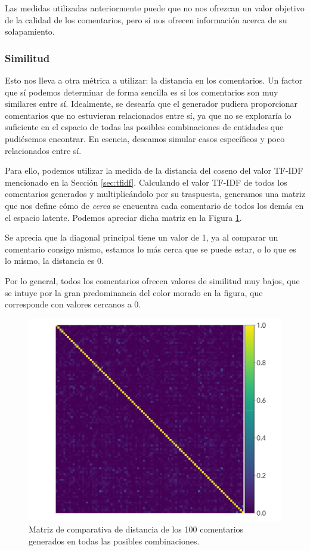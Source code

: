 Las medidas utilizadas anteriormente puede que no nos ofrezcan un valor objetivo de la calidad de los comentarios, pero sí nos ofrecen información acerca de su solapamiento.

\subsubsection{Similitud}
Esto nos lleva a otra métrica a utilizar: la distancia en los comentarios. Un factor que sí podemos determinar de forma sencilla es si los comentarios son muy similares entre sí. Idealmente, se desearía que el generador pudiera proporcionar comentarios que no estuvieran relacionados entre sí, ya que no se exploraría lo suficiente en el espacio de todas las posibles combinaciones de entidades que pudiésemos encontrar. En esencia, deseamos simular casos específicos y poco relacionados entre sí.

Para ello, podemos utilizar la medida de la distancia del coseno del valor TF-IDF mencionado en la  Sección \ref{sec:tfidf}. Calculando el valor TF-IDF de todos los comentarios generados y multiplicándolo por su traspuesta, generamos una matriz que nos define cómo de \textit{cerca} se encuentra cada comentario de todos los demás en el espacio latente. Podemos apreciar dicha matriz en la Figura \ref{fig:conf-tfidf}.

Se aprecia que la diagonal principal tiene un valor de 1, ya al comparar un comentario consigo mismo, estamos lo más cerca que se puede estar, o lo que es lo mismo, la distancia es 0.

Por lo general, todos los comentarios ofrecen valores de similitud muy bajos, que se intuye por la gran predominancia del color morado en la figura, que corresponde con valores cercanos a 0.

\begin{figure}[h]
	\centering
	\includegraphics[width=.6\textwidth]{media/conf_matrix_tfidf.pdf}
	\caption{Matriz de comparativa de distancia de los 100 comentarios generados en todas las posibles combinaciones.}
	\label{fig:conf-tfidf}
\end{figure}



